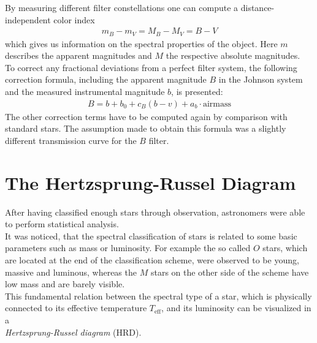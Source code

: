 By measuring different filter constellations one can compute a distance-independent color index
\begin{align}
	m_B - m_V = M_B - M_V = B-V
\end{align}
which gives us information on the spectral properties of the object. Here $m$ describes the apparent magnitudes and $M$ the respective absolute magnitudes. \\
To correct any fractional deviations from a perfect filter system, the following correction formula, including the apparent magnitude $B$ in the Johnson system and the measured instrumental magnitude $b$, is presented: 
\begin{align}
	B = b + b_0 + c_B(b-v) + a_b \cdot \text{airmass}
\end{align}
The other correction terms have to be computed again by comparison with standard stars. The assumption made to obtain this formula was a slightly different transmission curve for the $B$ filter.
\section{The Hertzsprung-Russel Diagram}
After having classified enough stars through observation, astronomers were able to perform statistical analysis. \\
It was noticed, that the spectral classification of  stars is related to some basic parameters such as mass or luminosity. For example the so called $O$ stars, which are located at the end of the classification scheme, were observed to be young, massive and luminous, whereas the $M$ stars on the other side of the scheme have low mass and are barely visible. \\
This fundamental relation between the spectral type of a star, which is physically connected to its effective temperature $T_{\text{eff}}$, and its luminosity can be visualized in a \\ \textit{Hertzsprung-Russel diagram} (HRD). 

